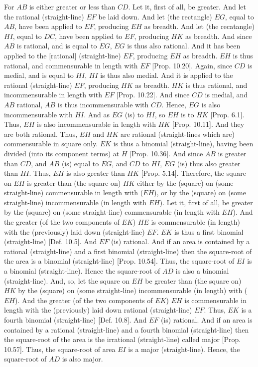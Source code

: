 \begin{Parallel}{}{}
{For $AB$ is either greater or less than $CD$. Let it, first of all,
be greater. And let the rational (straight-line) $EF$ be laid down. And
let (the rectangle) $EG$, equal to $AB$, have been applied to $EF$,
producing $EH$ as breadth. And let (the recatangle) $HI$, equal to $DC$,
have been applied to $EF$, producing $HK$ as breadth. And since
$AB$ is rational, and is equal to $EG$, $EG$ is thus also rational. And it
has been applied to the [rational] (straight-line) $EF$, producing $EH$
as breadth. $EH$ is thus rational, and commensurable in length
with $EF$ [Prop. 10.20]. Again, since
$CD$ is medial, and is equal to $HI$, $HI$ is thus also medial. 
And it is applied to the rational (straight-line) $EF$, producing
$HK$ as breadth. $HK$ is thus rational, and incommensurable
in length with $EF$ [Prop. 10.22]. And since
$CD$ is medial, and $AB$ rational, $AB$ is thus incommensurable
with $CD$. Hence, $EG$ is also incommensurable with $HI$. And
as $EG$ (is) to $HI$, so $EH$ is to $HK$ [Prop. 6.1].
Thus, $EH$ is also incommensurable in length with $HK$
[Prop. 10.11]. And they are both rational. Thus,
$EH$ and $HK$ are rational (straight-lines which are) commensurable in
 square only. $EK$ is thus a binomial (straight-line), having been divided
(into its component terms) at $H$ [Prop. 10.36].
And since $AB$ is greater than $CD$, and $AB$ (is) equal to $EG$, and
$CD$ to $HI$, $EG$ (is) thus also greater than $HI$. Thus, $EH$
is also greater than $HK$ [Prop. 5.14]. Therefore,
 the square on $EH$ is greater than (the square on) $HK$
either by the (square) on (some straight-line) commensurable in length
with ($EH$), or by the (square) on (some straight-line)  incommensurable
(in length with $EH$). 
Let it, first of all, be greater by the (square) on (some straight-line)
commensurable (in length with $EH$). And the greater (of the two components of $EK$) $HE$ is commensurable
(in length) with the (previously) laid down (straight-line) $EF$. $EK$ is thus a first binomial
(straight-line) [Def. 10.5]. And $EF$ (is) rational. And if an area is contained by a rational (straight-line) and a first
binomial (straight-line) then the square-root  of the  area is a binomial
(straight-line)  [Prop. 10.54]. Thus,
the square-root of $EI$ is a binomial (straight-line). Hence the square-root of $AD$ is also a binomial (straight-line).  And, so, let the
 square on $EH$ be greater than (the square on) $HK$ by the (square) on 
 (some straight-line) incommensurable (in length) with ($EH$). And the
 greater (of the two components of $EK$) $EH$ is commensurable in length with the (previously)
 laid down rational (straight-line) $EF$. Thus, $EK$ is a fourth
 binomial (straight-line) [Def. 10.8]. And
 $EF$ (is) rational. And if an area
 is contained by a rational (straight-line) and a fourth binomial (straight-line) 
 then the square-root of the area is the irrational (straight-line) called
 major [Prop. 10.57]. Thus, the square-root
 of area $EI$ is a major (straight-line). Hence, the square-root of
 $AD$ is also major.
 
}
\end{Parallel}
